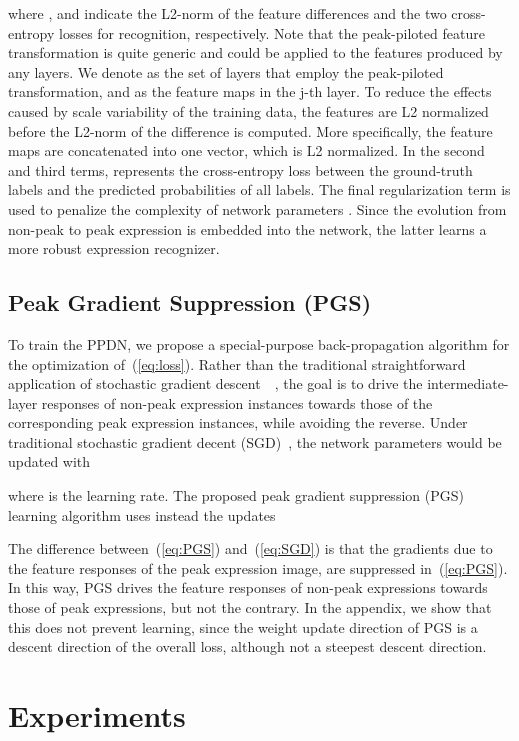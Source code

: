 \documentclass[runningheads]{llncs}
\begin{document}
where ,  and  indicate the L2-norm of the feature differences 
and the two cross-entropy losses for recognition, respectively. Note that the 
peak-piloted feature transformation is quite generic and could be applied to 
the features produced by any layers. We denote  as the set of layers 
that employ the peak-piloted transformation, and  as the 
feature maps in the j-th layer. To reduce the effects caused by scale 
variability of the training data, the features   are L2 normalized
before the L2-norm of the difference is computed. More specifically, the 
feature maps  are concatenated into one vector, which is L2 normalized. 
In the second and third terms,  represents the cross-entropy loss 
between the ground-truth labels and the predicted probabilities of all 
labels. The final regularization term is used to penalize the complexity of 
network parameters . Since the evolution from non-peak to 
peak expression is embedded into the network, the latter learns a more 
robust expression recognizer. 
 
\subsection{Peak Gradient Suppression (PGS)}

To train the PPDN, we propose a special-purpose back-propagation algorithm 
 for the optimization of~(\ref{eq:loss}). Rather than the traditional 
straightforward application of stochastic gradient 
descent~\cite{chopra2005learning}~\cite{schroff2015facenet}, the goal is to 
drive the intermediate-layer responses of non-peak expression instances 
towards those of the corresponding peak expression instances, while avoiding 
the reverse. Under traditional stochastic gradient decent 
(SGD)~\cite{bottou2010large}, the network parameters would be updated
with

where  is the learning rate. The proposed
peak gradient suppression (PGS) learning algorithm
uses instead the updates
 
The difference between~(\ref{eq:PGS}) and~(\ref{eq:SGD}) is that the 
gradients due to the feature responses of the peak expression image, 
 are suppressed 
in~(\ref{eq:PGS}). In this way, PGS drives the feature responses of
non-peak expressions towards those of peak expressions, but not the
contrary. In the appendix, we show that this does not prevent learning,
since the weight update direction of PGS  is a descent direction of
the overall loss, although not a steepest descent direction.
\section{Experiments}
\end{document}
